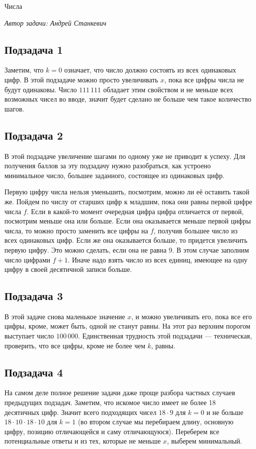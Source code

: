\begin{tutorial}{Числа}

\medskip
\textit{Автор задачи: Андрей Станкевич}
\medskip

\subsection*{Подзадача 1}
Заметим, что $k = 0$ означает, что число должно состоять из всех одинаковых цифр. В этой подзадаче можно просто увеличивать $x$, пока все цифры числа не будут одинаковы. Число $111\,111$ обладает этим свойством и не меньше всех возможных чисел во вводе, значит будет сделано не больше чем такое количество шагов.

\subsection*{Подзадача 2}
В этой подзадаче увеличение шагами по одному уже не приводит к успеху. Для получения баллов за эту подзадачу нужно разобраться, как устроено минимальное число, большее заданного, состоящее из одинаковых цифр. 

Первую цифру числа нельзя уменьшить, посмотрим, можно ли её оставить такой же.
Пойдем по числу от старших цифр к младшим, пока они равны первой цифре числа $f$. Если в какой-то момент очередная цифра цифра отличается от первой, посмотрим меньше она или больше. Если она оказывается меньше первой цифры числа, то можно просто заменить все цифры на $f$, получив большее число из всех одинаковых цифр. Если же она оказывается больше, то придется увеличить первую цифру. Это можно сделать, если она не равна 9. В этом случае заполним число цифрами $f+1$. Иначе надо взять число из всех единиц, имеющее на одну цифру в своей десятичной записи больше.

\subsection*{Подзадача 3}
В этой задаче снова маленькое значение $x$, и можно увеличивать его, пока все его цифры, кроме, может быть, одной не станут равны. На этот раз верхним порогом выступает число $100\,000$. Единственная трудность этой подзадачи --- техническая, проверить, что все цифры, кроме не более чем $k$, равны.

\subsection*{Подзадача 4}
На самом деле полное решение задачи даже проще разбора частных случаев предыдущих подзадач. Заметим, что искомое число имеет не более 18 десятичных цифр. Значит всего подходящих чисел $18\cdot 9$ для $k = 0$ и не больше $18\cdot 10 \cdot 18 \cdot 10$ для $k=1$ (во втором случае мы перебираем длину, основную цифру, позицию отличающейся и саму отличающуюся). Переберем все потенциальные ответы и из тех, которые не меньше $x$, выберем минимальный. 


\end{tutorial}
